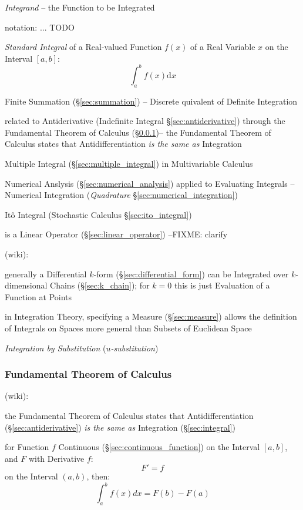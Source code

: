 \emph{Integrand} -- the Function to be Integrated

notation:
... TODO

\emph{Standard Integral} of a Real-valued Function $f(x)$ of a Real Variable $x$
on the Interval $[a,b]$:
\[
  \int_a^b f(x) \mathrm{d}x
\]

\fist Finite Summation (\S\ref{sec:summation}) -- Discrete quivalent of
Definite Integration

\fist related to Antiderivative (Indefinite Integral \S\ref{sec:antiderivative})
through the Fundamental Theorem of Calculus
(\S\ref{sec:fundamental_calculus_theorem})--
the Fundamental Theorem of Calculus states that Antidifferentiation \emph{is the
  same as} Integration

\fist Multiple Integral (\S\ref{sec:multiple_integral}) in Multivariable
Calculus

\fist Numerical Anslysis (\S\ref{sec:numerical_analysis}) applied to Evaluating
Integrals -- Numerical Integration (\emph{Quadrature}
\S\ref{sec:numerical_integration})

\fist It\^o Integral (Stochastic Calculus \S\ref{sec:ito_integral})

is a Linear Operator (\S\ref{sec:linear_operator}) --FIXME: clarify

(wiki):

generally a Differential $k$-form (\S\ref{sec:differential_form}) can be
Integrated over $k$-dimensional Chains (\S\ref{sec:k_chain}); for $k=0$ this is
just Evaluation of a Function at Points

in Integration Theory, specifying a Measure (\S\ref{sec:measure}) allows the
definition of Integrals on Spaces more general than Subsets of Euclidean Space

\asterism

\emph{Integration by Substitution} (\emph{$u$-substitution})



\subsubsection{Fundamental Theorem of Calculus}
\label{sec:fundamental_calculus_theorem}

(wiki):

the Fundamental Theorem of Calculus states that Antidifferentiation
(\S\ref{sec:antiderivative}) \emph{is the
  same as} Integration (\S\ref{sec:integral})

for Function $f$ Continuous (\S\ref{sec:continuous_function}) on the Interval
$[a,b]$, and $F$ with Derivative $f$:
\[
  F' = f
\]
on the Interval $(a,b)$, then:
\[
  \int_a^b f(x) dx = F(b) - F(a)
\]

